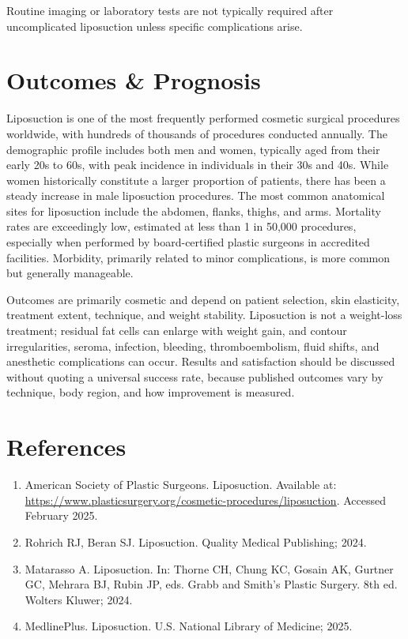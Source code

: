 Routine imaging or laboratory tests are not typically required after uncomplicated liposuction unless specific complications arise.

\section*{Outcomes \& Prognosis}
Liposuction is one of the most frequently performed cosmetic surgical procedures worldwide, with hundreds of thousands of procedures conducted annually. The demographic profile includes both men and women, typically aged from their early 20s to 60s, with peak incidence in individuals in their 30s and 40s. While women historically constitute a larger proportion of patients, there has been a steady increase in male liposuction procedures. The most common anatomical sites for liposuction include the abdomen, flanks, thighs, and arms. Mortality rates are exceedingly low, estimated at less than 1 in 50,000 procedures, especially when performed by board-certified plastic surgeons in accredited facilities. Morbidity, primarily related to minor complications, is more common but generally manageable.

Outcomes are primarily cosmetic and depend on patient selection, skin elasticity, treatment extent, technique, and weight stability. Liposuction is not a weight-loss treatment; residual fat cells can enlarge with weight gain, and contour irregularities, seroma, infection, bleeding, thromboembolism, fluid shifts, and anesthetic complications can occur. Results and satisfaction should be discussed without quoting a universal success rate, because published outcomes vary by technique, body region, and how improvement is measured.

\section*{References}
\begin{enumerate}
  \item American Society of Plastic Surgeons. Liposuction. Available at: \url{https://www.plasticsurgery.org/cosmetic-procedures/liposuction}. Accessed February 2025.
  
  \item Rohrich RJ, Beran SJ. Liposuction. Quality Medical Publishing; 2024.
  
  \item Matarasso A. Liposuction. In: Thorne CH, Chung KC, Gosain AK, Gurtner GC, Mehrara BJ, Rubin JP, eds. Grabb and Smith's Plastic Surgery. 8th ed. Wolters Kluwer; 2024.
  
  \item MedlinePlus. Liposuction. U.S. National Library of Medicine; 2025.
\end{enumerate}

\clearpage
